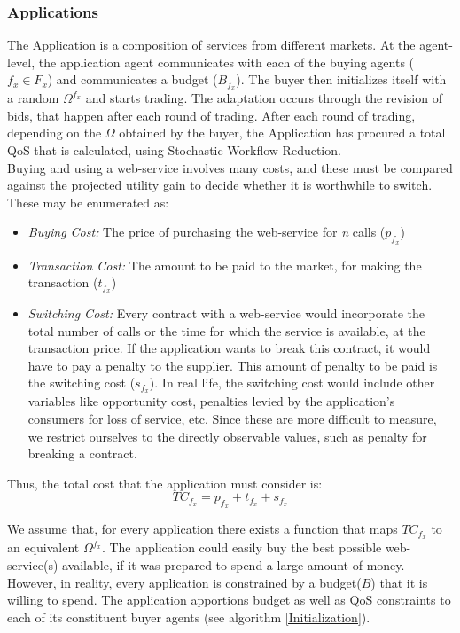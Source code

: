 \documentclass[10pt,journal,compsoc]{IEEEtran}
\begin{document}
\subsubsection{Applications}
The Application is a composition of services from different markets. At the agent-level, the application agent communicates with each of the buying agents ($f_{x} \in F_{x}$) and communicates a budget ($B_{f_{x}}$). The buyer then initializes itself with a random $\Omega^{f_x}$ and starts trading. The adaptation occurs through the revision of bids, that happen after each round of trading. After each round of trading, depending on the $\Omega$ obtained by the buyer, the Application has procured a total QoS that is calculated, using Stochastic Workflow Reduction\cite{Cardoso2004}.\\
Buying and using a web-service involves many costs, and these must be compared against the projected utility gain to decide whether it is worthwhile to switch. These may be enumerated as:
	\begin{itemize}
	 \item \textit{Buying Cost:} The price of purchasing the web-service for \textsl{n} calls ($p_{f_x}$)
	 \item \textit{Transaction Cost:} The amount to be paid to the market, for making the transaction ($t_{f_x}$)
	 \item \textit{Switching Cost:} Every contract with a web-service would incorporate the total number of calls or the time for which the service is available, at the transaction price. If the application wants to break this contract, it would have to pay a penalty to the supplier. This amount of penalty to be paid is the switching cost ($s_{f_x}$). In real life, the switching cost would include other variables like opportunity cost, penalties levied by the application's consumers for loss of service, etc. Since these are more difficult to measure, we restrict ourselves to the directly observable values, such as penalty for breaking a contract.
	 \end{itemize}
Thus, the total cost that the application must consider is:
	\begin{equation}\label{eq:total_cost} 
	 TC_{f_x} = p_{f_x} + t_{f_x} + s_{f_x}
	\end{equation}
	 
We assume that, for every application there exists a function that maps $TC_{f_x}$ to an equivalent $\Omega^{f_x}$. The application could easily buy the best possible web-service(s) available, if it was prepared to spend a large amount of money. However, in reality, every application is constrained by a budget($B$) that it is willing to spend. The application apportions budget as well as QoS constraints to each of its constituent buyer agents (see algorithm \ref{Initialization}).
\end{document}
